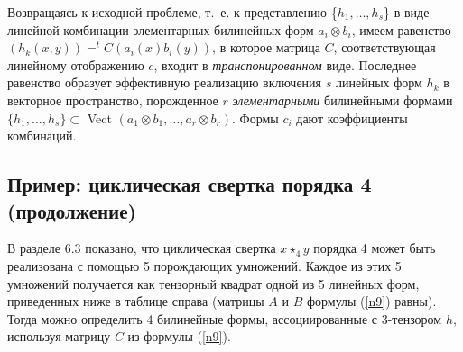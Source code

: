 \documentclass{mai_book}
\begin{document}
Возвращаясь к исходной проблеме, т.~е. к представлению \{$h_1,\dots,h_s$\} в виде линейной комбинации элементарных билинейных форм $a_i \otimes b_i$, имеем равенство $(h_k(x,y)) =^tC(a_i(x)b_i(y))$, в которое матрица $C$, соответствующая линейному отображению $c$, входит в \textit{транспонированном} виде. Последнее равенство образует эффективную реализацию включения $s$ линейных форм $h_k$ в векторное пространство, порожденное $r$ \textit{элементарными} билинейными формами $\{h_1,\dots,h_s\} \subset$ Vect $(a_1 \otimes b_1,\dots,a_r \otimes b_r).$ Формы $c_i$ дают коэффициенты комбинаций.
\subsection{Пример: циклическая свертка порядка 4 (продолжение)}
В разделе 6.3 показано, что циклическая свертка $x \star _4 y$ порядка 4 может быть реализована с помощью 5 порождающих умножений. Каждое из этих 5 умножений получается как тензорный квадрат одной из 5 линейных форм, приведенных ниже в таблице справа (матрицы $A$ и $B$ формулы (\ref{n9}) равны). Тогда можно определить 4 билинейные формы, ассоциированные с 3-тензором $h$, используя матрицу $C$ из формулы (\ref{n9}).
\end{document}
